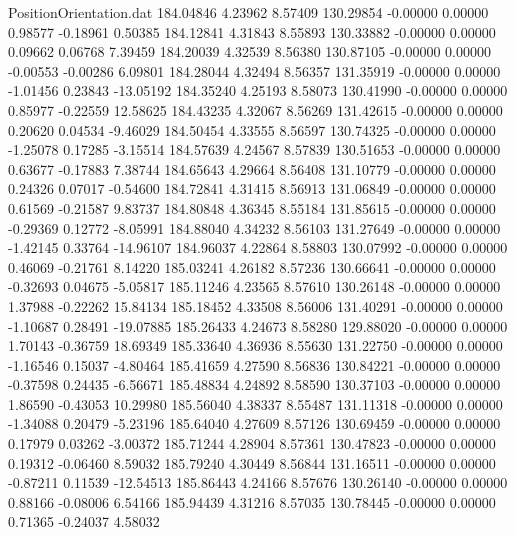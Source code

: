 \begin{filecontents}{PositionOrientation.dat}
 184.04846    4.23962    8.57409   130.29854   -0.00000    0.00000    0.98577   -0.18961    0.50385
 184.12841    4.31843    8.55893   130.33882   -0.00000    0.00000    0.09662    0.06768    7.39459
 184.20039    4.32539    8.56380   130.87105   -0.00000    0.00000   -0.00553   -0.00286    6.09801
 184.28044    4.32494    8.56357   131.35919   -0.00000    0.00000   -1.01456    0.23843  -13.05192
 184.35240    4.25193    8.58073   130.41990   -0.00000    0.00000    0.85977   -0.22559   12.58625
 184.43235    4.32067    8.56269   131.42615   -0.00000    0.00000    0.20620    0.04534   -9.46029
 184.50454    4.33555    8.56597   130.74325   -0.00000    0.00000   -1.25078    0.17285   -3.15514
 184.57639    4.24567    8.57839   130.51653   -0.00000    0.00000    0.63677   -0.17883    7.38744
 184.65643    4.29664    8.56408   131.10779   -0.00000    0.00000    0.24326    0.07017   -0.54600
 184.72841    4.31415    8.56913   131.06849   -0.00000    0.00000    0.61569   -0.21587    9.83737
 184.80848    4.36345    8.55184   131.85615   -0.00000    0.00000   -0.29369    0.12772   -8.05991
 184.88040    4.34232    8.56103   131.27649   -0.00000    0.00000   -1.42145    0.33764  -14.96107
 184.96037    4.22864    8.58803   130.07992   -0.00000    0.00000    0.46069   -0.21761    8.14220
 185.03241    4.26182    8.57236   130.66641   -0.00000    0.00000   -0.32693    0.04675   -5.05817
 185.11246    4.23565    8.57610   130.26148   -0.00000    0.00000    1.37988   -0.22262   15.84134
 185.18452    4.33508    8.56006   131.40291   -0.00000    0.00000   -1.10687    0.28491  -19.07885
 185.26433    4.24673    8.58280   129.88020   -0.00000    0.00000    1.70143   -0.36759   18.69349
 185.33640    4.36936    8.55630   131.22750   -0.00000    0.00000   -1.16546    0.15037   -4.80464
 185.41659    4.27590    8.56836   130.84221   -0.00000    0.00000   -0.37598    0.24435   -6.56671
 185.48834    4.24892    8.58590   130.37103   -0.00000    0.00000    1.86590   -0.43053   10.29980
 185.56040    4.38337    8.55487   131.11318   -0.00000    0.00000   -1.34088    0.20479   -5.23196
 185.64040    4.27609    8.57126   130.69459   -0.00000    0.00000    0.17979    0.03262   -3.00372
 185.71244    4.28904    8.57361   130.47823   -0.00000    0.00000    0.19312   -0.06460    8.59032
 185.79240    4.30449    8.56844   131.16511   -0.00000    0.00000   -0.87211    0.11539  -12.54513
 185.86443    4.24166    8.57676   130.26140   -0.00000    0.00000    0.88166   -0.08006    6.54166
 185.94439    4.31216    8.57035   130.78445   -0.00000    0.00000    0.71365   -0.24037    4.58032

\end{filecontents}

